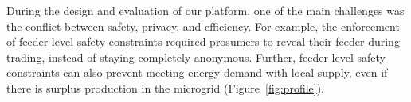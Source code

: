 During the design and evaluation of our platform, one of the main challenges was the conflict between safety, privacy, and efficiency.
For example, the enforcement of feeder-level safety constraints required prosumers to reveal their feeder during trading, instead of staying completely anonymous.
Further, feeder-level safety constraints can also prevent meeting energy demand with local supply, even if there is surplus production in the microgrid (Figure~\ref{fig:profile}).